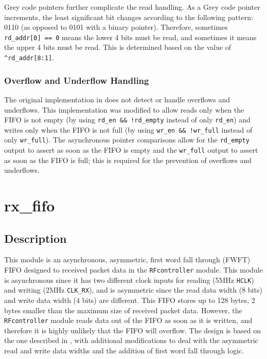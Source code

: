 Grey code pointers further complicate the read handling. As a Grey code pointer increments, the least significant bit changes according to the following pattern: 0110 (as opposed to 0101 with a binary pointer). Therefore, sometimes \texttt{rd\_addr[0] == 0} means the lower 4 bits must be read, and sometimes it means the upper 4 bits must be read. This is determined based on the value of \texttt{\textasciicircum rd\_addr[8:1]}.

\subsubsection{Overflow and Underflow Handling}
The original implementation in \cite{async-fifo} does not detect or handle overflows and underflows. This implementation was modified to allow reads only when the FIFO is not empty (by using \texttt{rd\_en \&\& !rd\_empty} instead of only \texttt{rd\_en}) and writes only when the FIFO is not full (by using \texttt{wr\_en \&\& !wr\_full} instead of only \texttt{wr\_full}). The asynchronous pointer comparisons allow for the \texttt{rd\_empty} output to assert as soon as the FIFO is empty and the \texttt{wr\_full} output to assert as soon as the FIFO is full; this is required for the prevention of overflows and underflows.

\section{rx\_fifo} \label{rx-fifo}
\subsection{Description}
This module is an asynchronous, asymmetric, first word fall through (FWFT) FIFO designed to received packet data in the \texttt{RFcontroller} module. This module is asynchronous since it has two different clock inputs for reading (5MHz \texttt{HCLK}) and writing (2MHz \texttt{CLK\_RX}), and is asymmetric since the read data width (8 bits) and write data width (4 bits) are different. This FIFO stores up to 128 bytes, 2 bytes smaller than the maximum size of received packet data. However, the \texttt{RFcontroller} module reads data out of the FIFO as soon as it is written, and therefore it is highly unlikely that the FIFO will overflow. The design is based on the one described in \cite{async-fifo}, with additional modifications to deal with the asymmetric read and write data widths and the addition of first word fall through logic.

